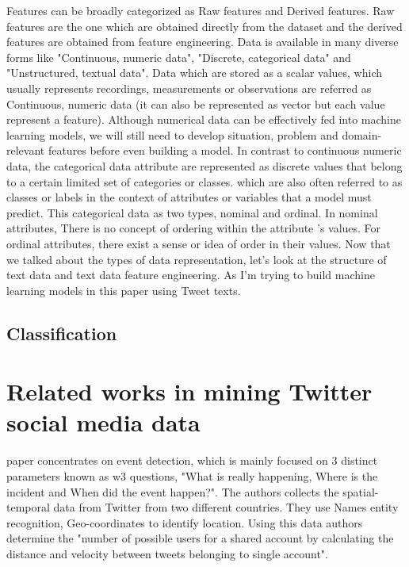 Features can be broadly categorized as Raw features and Derived features. Raw features are the one which are obtained directly from the dataset and the derived features are obtained from feature engineering. Data is available in many diverse forms like "Continuous, numeric data", "Discrete, categorical data" and "Unstructured, textual data". Data which are stored as a scalar values, which usually represents recordings, measurements or observations are referred as Continuous, numeric data (it can also be represented as vector but each value represent a feature). Although numerical data can be effectively fed into machine learning models, we will still need to develop situation, problem and domain-relevant features before even building a model. In contrast to continuous numeric data, the categorical data attribute are represented as discrete values that belong to a certain limited set of categories or classes. which are also often referred to as classes or labels in the context of attributes or variables that a model must predict. This categorical data as two types, nominal and ordinal. In nominal attributes, There is no concept of ordering within the attribute 's values. For ordinal attributes, there exist a sense or idea of order in their values. Now that we talked about the types of data representation, let's look at the structure of text data and text data feature engineering. As I'm trying to build machine learning models in this paper using Tweet texts.




\subsection{Classification}









\section{Related works in mining Twitter social media data}




\cite{Goergen} paper concentrates on event detection, which is mainly focused on 3 distinct parameters
known as w3 questions, "What is really happening, Where is the incident and When did the
event happen?". The authors collects the spatial-temporal data from Twitter from two different
countries. They use Names entity recognition, Geo-coordinates to identify location. Using this
data authors determine the "number of possible users for a shared account by calculating the
distance and velocity between tweets belonging to single account".

